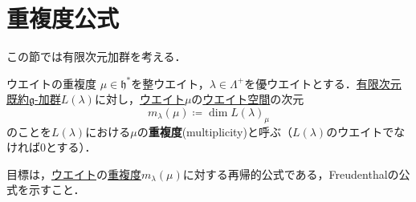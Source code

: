 \documentclass[rep_main]{subfiles}
\begin{document}
\section{重複度公式}
この節では有限次元加群を考える．
\begin{mydef}[label=def:mutiplicity]{ウエイトの重複度}
	$\mu \in \mathfrak{h}^*$を整ウエイト，$\lambda \in \Lambda^+$を優ウエイトとする．\hyperref[thm:hwmodule-exist]{有限次元既約$\mathfrak{g}$-加群}$L(\lambda)$に対し，\hyperref[def:weight-rep]{ウエイト}$\mu$の\hyperref[def:weight-rep]{ウエイト空間}の次元
	\begin{equation}
		m_\lambda(\mu) \coloneqq \dim L(\lambda)_\mu
	\end{equation}
	のことを$L(\lambda)$における$\mu$の\textbf{重複度}(multiplicity)と呼ぶ（$L(\lambda)$のウエイトでなければ$0$とする）．
\end{mydef}
目標は，\hyperref[def:weight-rep]{ウエイト}の\hyperref[def:mutiplicity]{重複度}$m_\lambda(\mu)$に対する再帰的公式である，Freudenthalの公式を示すこと．
\end{document}
